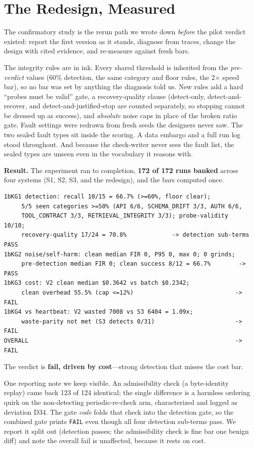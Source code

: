 \documentclass[acmsmall,screen]{acmart}
\begin{document}
\section{The Redesign, Measured}
The confirmatory study is the rerun path we wrote down \emph{before} the pilot
verdict existed: report the first version as it stands, diagnose from traces,
change the design with cited evidence, and re-measure against fresh bars.

The integrity rules are in ink. Every shared threshold is inherited from the
\emph{pre-verdict} values (60\% detection, the same category and floor rules,
the 2$\times$ speed bar), so no bar was set by anything the diagnosis told us.
New rules add a hard ``probes must be valid'' gate, a recovery-quality clause
(detect-only, detect-and-recover, and detect-and-justified-stop are counted
separately, so stopping cannot be dressed up as success), and \emph{absolute}
noise caps in place of the broken ratio gate. Fault settings were redrawn from
fresh seeds the designers never saw. The two sealed fault types sit inside the
scoring. A data embargo and a full run log stood throughout. And because the
check-writer never sees the fault list, the sealed types are unseen even in the
vocabulary it reasons with.

\textbf{Result.} The experiment ran to completion, \textbf{172 of 172 runs
banked} across four systems (S1, S2, S3, and the redesign), and the bars
computed once.

\begin{lstlisting}
1bKG1 detection: recall 10/15 = 66.7% (>=60%, floor clear);
     5/5 seen categories >=50% (API 6/6, SCHEMA_DRIFT 3/3, AUTH 6/6,
     TOOL_CONTRACT 3/3, RETRIEVAL_INTEGRITY 3/3); probe-validity 10/10;
     recovery-quality 17/24 = 70.8%             -> detection sub-terms PASS
1bKG2 noise/self-harm: clean median FIR 0, P95 0, max 0; 0 grinds;
     pre-detection median FIR 0; clean success 8/12 = 66.7%        -> PASS
1bKG3 cost: V2 clean median $0.3642 vs batch $0.2342;
     clean overhead 55.5% (cap <=12%)                             -> FAIL
1bKG4 vs heartbeat: V2 wasted 7008 vs S3 6404 = 1.09x;
     waste-parity not met (S3 detects 0/31)                       -> FAIL
OVERALL                                                           -> FAIL
\end{lstlisting}

The verdict is \textbf{fail, driven by cost}---strong detection that misses the
cost bar.

One reporting note we keep visible. An admissibility check (a byte-identity
replay) came back 123 of 124 identical; the single difference is a harmless
ordering quirk on the non-detecting periodic-re-check arm, characterized and
logged as deviation D34. The gate \emph{code} folds that check into the
detection gate, so the combined gate prints \texttt{FAIL} even though all four
detection sub-terms pass. We report it split out (detection passes; the
admissibility check is fine bar one benign diff) and note the overall fail is
unaffected, because it rests on cost.
\end{document}
